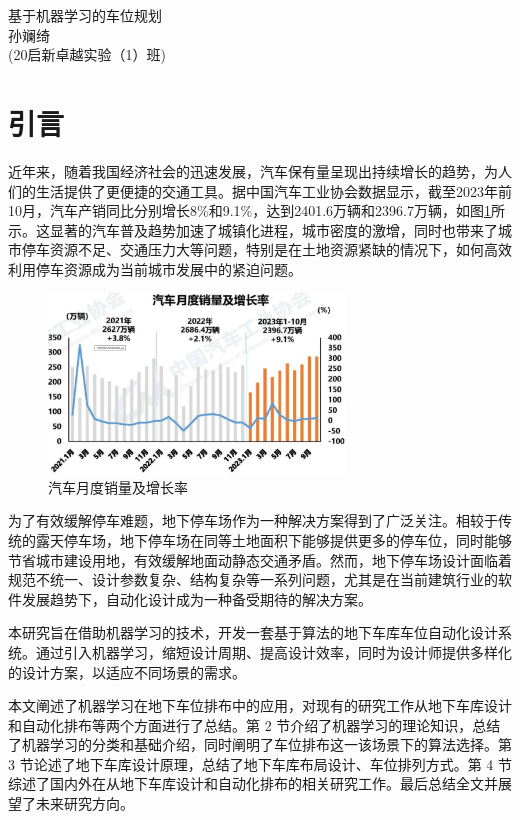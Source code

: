 \setcounter{page}{1}
\begin{center}
    \heiti {}基于机器学习的车位规划\\
    \songti {}孙斓绮\\
    (20启新卓越实验（1）班)
\end{center}
\songti {}
\section{引言}
近年来，随着我国经济社会的迅速发展，汽车保有量呈现出持续增长的趋势，为人们的生活提供了更便捷的交通工具。据中国汽车工业协会数据显示，截至2023年前10月，汽车产销同比分别增长8\%和9.1\%，达到2401.6万辆和2396.7万辆，如图\ref{fig:cars_sales}所示。这显著的汽车普及趋势加速了城镇化进程\cite{XXCZ202306017}，城市密度的激增\cite{JZXB201004006}，同时也带来了城市停车资源不足、交通压力大等问题\cite{CSDQ200708009}，特别是在土地资源紧缺的情况下，如何高效利用停车资源成为当前城市发展中的紧迫问题。
\begin{figure}[H]
  \centering
  \includegraphics[width=0.7\textwidth]{pictures/汽车月度销量及增长率.png}
  \caption{汽车月度销量及增长率}
  \label{fig:cars_sales}
\end{figure}
为了有效缓解停车难题，地下停车场\cite{JSSD201905002}作为一种解决方案得到了广泛关注。相较于传统的露天停车场，地下停车场在同等土地面积下能够提供更多的停车位\cite{1022811825.nh}，同时能够节省城市建设用地，有效缓解地面动静态交通矛盾\cite{CSDQ201807120}。然而，地下停车场设计面临着规范不统一、设计参数复杂\cite{ZGBZ202119043}、结构复杂等一系列问题，尤其是在当前建筑行业的软件发展趋势下，自动化设计成为一种备受期待的解决方案。

本研究旨在借助机器学习的技术，开发一套基于算法的地下车库车位自动化设计系统。通过引入机器学习，缩短设计周期、提高设计效率，同时为设计师提供多样化的设计方案，以适应不同场景的需求。

本文阐述了机器学习在地下车位排布中的应用，对现有的研究工作从地下车库设计和自动化排布等两个方面进行了总结。第 2 节介绍了机器学习的理论知识，总结了机器学习的分类和基础介绍，同时阐明了车位排布这一该场景下的算法选择。第 3 节论述了地下车库设计原理，总结了地下车库布局设计、车位排列方式。第 4 节综述了国内外在从地下车库设计和自动化排布的相关研究工作。最后总结全文并展望了未来研究方向。
